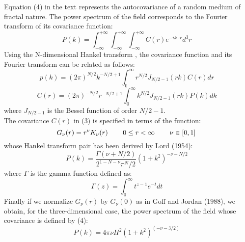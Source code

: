
Equation (4) in the text represents the autocovariance of a random medium
of fractal nature. The power spectrum of the field corresponds to 
the Fourier transform of its covariance function:
\begin{equation}
P(k)=\int_{-\infty}^{+\infty}\int_{-\infty}^{+\infty}\int_{-\infty}^{+\infty} C(r)e^{-ik\cdot r} d^3r \
\label {eqA1}
\end{equation}
Using the N-dimensional Hankel transform \cite[]{lord}, the covariance function
and its Fourier transform can be related as follows:
\begin{equation}
p(k)=(2\pi)^{N/2}k^{-N/2+1}\int_{0}^{\infty} r^{N/2}J_{N/2-1}(rk)C(r)dr \
\label {eqA2}
\end{equation}
\begin{equation}
C(r)=(2\pi)^{-N/2}r^{-N/2+1}\int_{0}^{\infty} k^{N/2}J_{N/2-1}(rk)P(k)dk \
\label {eqA3}
\end{equation}
where $J_{N/2-1}$ is the Bessel function of order $N/2-1$.\\
The covariance $C(r)$ in (3) is specified in terms of the function:
\begin{equation}
G_\nu (r)=r^\nu K_\nu (r) \hspace{.3in} 0\leq r < \infty \hspace{.3in} \nu \in [0,1]\ 
\label {eqA4}
\end{equation} 
whose Hankel transform pair has been derived by Lord (1954):
\begin{equation} 
P(k)=\frac {\Gamma{(\nu +N/2)}} {2^{1-N-\nu}\pi{^N/2}} {(1+k^2)}^{-\nu-N/2} \ 
\label {eqA5} 
\end{equation}
where $\Gamma$ is the gamma function defined as:
\begin{equation}
\Gamma (z)= \int_{0}^{\infty} t^{z-1}e^{-t} dt \
\label {eqA6}
\end{equation}
Finally if we normalize $G_\nu (r)$ by $G_\nu (0)$ as in Goff and Jordan (1988), we 
obtain, for the three-dimensional case, the power spectrum of the field 
whose covariance is defined by (4):
\begin{equation}
P(k)=4\pi\nu H^2 {(1+k^2)}^{(-\nu-3/2)} \
\label {eqA7}
\end{equation}





